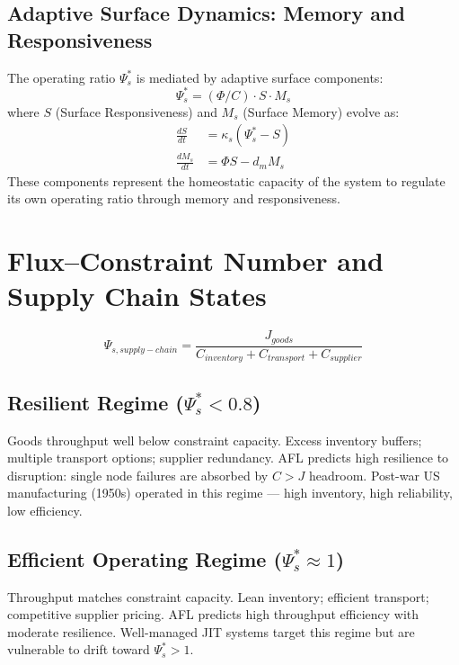 \documentclass[11pt]{article}
\begin{document}
\subsection{Adaptive Surface Dynamics: Memory and Responsiveness}

The operating ratio $\Psi_s^*$ is mediated by adaptive surface components:
\begin{equation}
\Psi_s^* = (\Phi/C) \cdot S \cdot M_s
\end{equation}
where $S$ (Surface Responsiveness) and $M_s$ (Surface Memory) evolve as:
\begin{align}
\frac{dS}{dt} &= \kappa_s (\Psi_s^* - S) \\
\frac{dM_s}{dt} &= \Phi S - d_m M_s
\end{align}
These components represent the homeostatic capacity of the system to regulate its own operating ratio through memory and responsiveness.

\section{Flux--Constraint Number and Supply Chain States}

\begin{equation}
\Psi_{s,supply-chain} = \frac{J_{goods}}{C_{inventory} + C_{transport} + C_{supplier}}
\end{equation}

\subsection{Resilient Regime ($\Psi_s^* < 0.8$)}

Goods throughput well below constraint capacity. Excess inventory buffers; multiple transport
options; supplier redundancy. AFL predicts high resilience to disruption: single node failures
are absorbed by $C > J$ headroom. Post-war US manufacturing (1950s) operated in this regime
--- high inventory, high reliability, low efficiency.

\subsection{Efficient Operating Regime ($\Psi_s^* \approx 1$)}

Throughput matches constraint capacity. Lean inventory; efficient transport; competitive supplier
pricing. AFL predicts high throughput efficiency with moderate resilience. Well-managed JIT
systems target this regime but are vulnerable to drift toward $\Psi_s^* > 1$.
\end{document}
